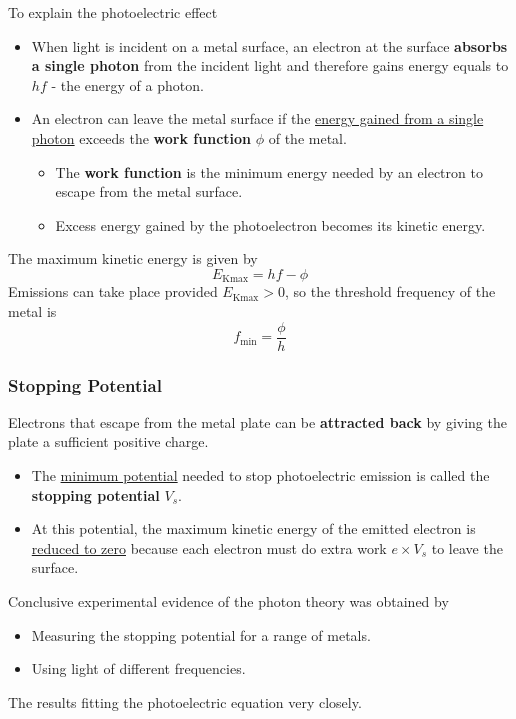 To explain the photoelectric effect
\begin{itemize}
    \item When light is incident on a metal surface, an electron at the surface \textbf{absorbs a single photon} from the incident light and therefore gains energy equals to $hf$ - the energy of a photon.
    \item An electron can leave the metal surface if the \underline{energy gained from a single photon} exceeds the \textbf{work function} $\phi$ of the metal.
        \begin{itemize}
            \item The \textbf{work function} is the minimum energy needed by an electron to escape from the metal surface.
            \item Excess energy gained by the photoelectron becomes its kinetic energy.
        \end{itemize}
\end{itemize}
The maximum kinetic energy is given by
$$E_\text{Kmax}=hf-\phi$$
Emissions can take place provided $E_\text{Kmax}>0$, so the threshold frequency of the metal is
$$f_\text{min}=\frac{\phi}{h}$$

\subsubsection*{Stopping Potential}

Electrons that escape from the metal plate can be \textbf{attracted back} by giving the plate a sufficient positive charge.
\begin{itemize}
    \item The \underline{minimum potential} needed to stop photoelectric emission is called the \textbf{stopping potential} $V_s$.
    \item At this potential, the maximum kinetic energy of the emitted electron is \underline{reduced to zero} because each electron must do extra work $e\times V_s$ to leave the surface.
\end{itemize}
Conclusive experimental evidence of the photon theory was obtained by
\begin{itemize}
    \item Measuring the stopping potential for a range of metals.
    \item Using light of different frequencies.
\end{itemize}
The results fitting the photoelectric equation very closely.
